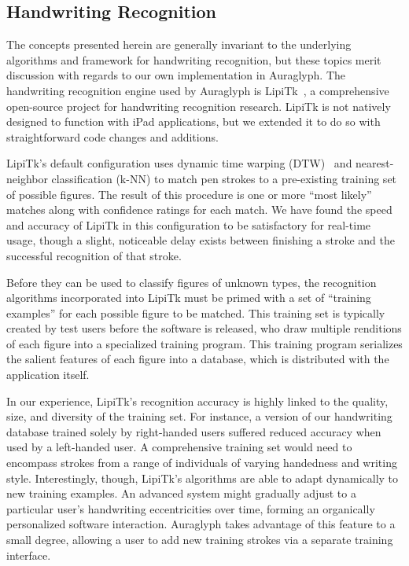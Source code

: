 \documentclass[10pt,letterpaper]{article}
\begin{document}
\subsection{Handwriting Recognition}
\label{sec:HandwritingRecognition}

The concepts presented herein are generally invariant to the underlying algorithms and framework for handwriting recognition, but these topics merit discussion with regards to our own implementation in Auraglyph. 
The handwriting recognition engine used by Auraglyph is LipiTk~\cite{madhvanath2007lipitk}, a comprehensive open-source project for handwriting recognition research. 
LipiTk is not natively designed to function with iPad applications, but we extended it to do so with straightforward code changes and additions. 

LipiTk's default configuration uses dynamic time warping (DTW)~\cite{niels2005using} and nearest-neighbor classification (k-NN) to match pen strokes to a pre-existing training set of possible figures. 
The result of this procedure is one or more ``most likely'' matches along with confidence ratings for each match. 
We have found the speed and accuracy of LipiTk in this configuration to be satisfactory for real-time usage, though a slight, noticeable delay exists between finishing a stroke and the successful recognition of that stroke. 

Before they can be used to classify figures of unknown types, the recognition algorithms incorporated into LipiTk must be primed with a set of ``training examples'' for each possible figure to be matched. 
This training set is typically created by test users before the software is released, who draw multiple renditions of each figure into a specialized training program. 
This training program serializes the salient features of each figure into a database, which is distributed with the application itself. 

In our experience, LipiTk's recognition accuracy is highly linked to the quality, size, and diversity of the training set. 
For instance, a version of our handwriting database trained solely by right-handed users suffered reduced accuracy when used by a left-handed user. 
A comprehensive training set would need to encompass strokes from a range of individuals of varying handedness and writing style. 
Interestingly, though, LipiTk's algorithms are able to adapt dynamically to new training examples. 
An advanced system might gradually adjust to a particular user's handwriting eccentricities over time, forming an organically personalized software interaction. 
Auraglyph takes advantage of this feature to a small degree, allowing a user to add new training strokes via a separate training interface. 
\end{document}
